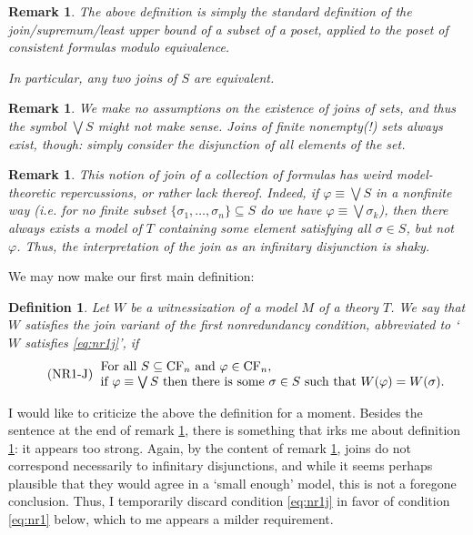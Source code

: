 \documentclass{article}
\newtheorem{remark}[theorem]{Remark}
\newtheorem{definition}[theorem]{Definition}
\theoremstyle{nonumberplain}
\newcommand{\CF}{\mathrm{CF}}
\begin{document}
\begin{remark}
The above definition is simply the standard definition of the join\slash supremum\slash least upper bound of a subset of a poset, applied to the poset of consistent formulas modulo equivalence.

In particular, any two joins of $S$ are equivalent.
\end{remark}

\begin{remark}
We make no assumptions on the existence of joins of sets, and thus the symbol $\bigvee S$ might not make sense. Joins of finite nonempty(!) sets always exist, though: simply consider the disjunction of all elements of the set.
\end{remark}

\begin{remark}\label{rmk:shaky}
This notion of join of a collection of formulas has weird model-theoretic repercussions, or rather lack thereof. Indeed, if $\varphi \equiv \bigvee S$ in a nonfinite way (i.e. for no finite subset $\{\sigma_1, \dots, \sigma_n\}\subseteq S$ do we have $\varphi \equiv \bigvee \sigma_k$), then there always exists a model of $T$ containing some element satisfying all $\sigma \in S$, but not $\varphi$. Thus, the interpretation of the join as an infinitary disjunction is shaky.
\end{remark}

We may now make our first main definition:
\begin{definition}\label{def:nr1j}
Let $W$ be a witnessization of a model $M$ of a theory $T$. We say that $W$ satisfies the \emph{join variant of the first nonredundancy condition}, abbreviated to `$W$ satisfies \eqref{eq:nr1j}', if
\begin{equation}
\tag{NR1-J}\label{eq:nr1j}
\begin{tabular}{ll}
For all $S \subseteq \CF_n$ and $\varphi \in \CF_n$,\\
if $\varphi \equiv \bigvee S$ then there is some $\sigma \in S$ such that $W(\varphi) = W(\sigma)$.
\end{tabular}
\end{equation}
\end{definition}

I would like to criticize the above the definition for a moment. Besides the sentence at the end of remark \ref{rmk:shaky}, there is something that irks me about definition \ref{def:nr1j}: it appears too strong. Again, by the content of remark \ref{rmk:shaky}, joins do not correspond necessarily to infinitary disjunctions, and while it seems perhaps plausible that they would agree in a `small enough' model, this is not a foregone conclusion. Thus, I temporarily discard condition \eqref{eq:nr1j} in favor of condition \eqref{eq:nr1} below, which to me appears a milder requirement.
\end{document}
